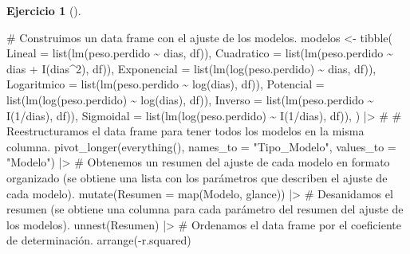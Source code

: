 \documentclass[
  spanish,
  a4paper,
]{scrreport}
\newenvironment{Shaded}{\begin{snugshade}}{\end{snugshade}}
\newcommand{\AttributeTok}[1]{\textcolor[rgb]{0.40,0.45,0.13}{#1}}
\newcommand{\CommentTok}[1]{\textcolor[rgb]{0.37,0.37,0.37}{#1}}
\newcommand{\DecValTok}[1]{\textcolor[rgb]{0.68,0.00,0.00}{#1}}
\newcommand{\FunctionTok}[1]{\textcolor[rgb]{0.28,0.35,0.67}{#1}}
\newcommand{\NormalTok}[1]{\textcolor[rgb]{0.00,0.23,0.31}{#1}}
\newcommand{\OtherTok}[1]{\textcolor[rgb]{0.00,0.23,0.31}{#1}}
\newcommand{\SpecialCharTok}[1]{\textcolor[rgb]{0.37,0.37,0.37}{#1}}
\newcommand{\StringTok}[1]{\textcolor[rgb]{0.13,0.47,0.30}{#1}}
\theoremstyle{definition}
\newtheorem{exercise}{Ejercicio}[chapter]
\theoremstyle{remark}
\begin{document}
\begin{exercise}[]
\begin{enumerate}
\begin{tcolorbox}
\begin{Shaded}
\begin{Highlighting}[]
\CommentTok{\# Construimos un data frame con el ajuste de los modelos.}
\NormalTok{modelos }\OtherTok{\textless{}{-}} \FunctionTok{tibble}\NormalTok{(}
        \AttributeTok{Lineal =} \FunctionTok{list}\NormalTok{(}\FunctionTok{lm}\NormalTok{(peso.perdido }\SpecialCharTok{\textasciitilde{}}\NormalTok{ dias, df)),}
        \AttributeTok{Cuadratico =} \FunctionTok{list}\NormalTok{(}\FunctionTok{lm}\NormalTok{(peso.perdido }\SpecialCharTok{\textasciitilde{}}\NormalTok{ dias }\SpecialCharTok{+} \FunctionTok{I}\NormalTok{(dias}\SpecialCharTok{\^{}}\DecValTok{2}\NormalTok{), df)),}
        \AttributeTok{Exponencial =} \FunctionTok{list}\NormalTok{(}\FunctionTok{lm}\NormalTok{(}\FunctionTok{log}\NormalTok{(peso.perdido) }\SpecialCharTok{\textasciitilde{}}\NormalTok{ dias, df)),}
        \AttributeTok{Logaritmico =} \FunctionTok{list}\NormalTok{(}\FunctionTok{lm}\NormalTok{(peso.perdido }\SpecialCharTok{\textasciitilde{}} \FunctionTok{log}\NormalTok{(dias), df)),}
        \AttributeTok{Potencial =} \FunctionTok{list}\NormalTok{(}\FunctionTok{lm}\NormalTok{(}\FunctionTok{log}\NormalTok{(peso.perdido) }\SpecialCharTok{\textasciitilde{}} \FunctionTok{log}\NormalTok{(dias), df)),}
        \AttributeTok{Inverso =} \FunctionTok{list}\NormalTok{(}\FunctionTok{lm}\NormalTok{(peso.perdido }\SpecialCharTok{\textasciitilde{}} \FunctionTok{I}\NormalTok{(}\DecValTok{1}\SpecialCharTok{/}\NormalTok{dias), df)),}
        \AttributeTok{Sigmoidal =} \FunctionTok{list}\NormalTok{(}\FunctionTok{lm}\NormalTok{(}\FunctionTok{log}\NormalTok{(peso.perdido) }\SpecialCharTok{\textasciitilde{}} \FunctionTok{I}\NormalTok{(}\DecValTok{1}\SpecialCharTok{/}\NormalTok{dias), df)),}
\NormalTok{    )  }\SpecialCharTok{|\textgreater{}} 
    \CommentTok{\# }
    \CommentTok{\# Reestructuramos el data frame para tener todos los modelos en la misma columna.}
    \FunctionTok{pivot\_longer}\NormalTok{(}\FunctionTok{everything}\NormalTok{(), }\AttributeTok{names\_to =} \StringTok{"Tipo\_Modelo"}\NormalTok{, }\AttributeTok{values\_to =} \StringTok{"Modelo"}\NormalTok{)  }\SpecialCharTok{|\textgreater{}} 
    \CommentTok{\# Obtenemos un resumen del ajuste de cada modelo en formato organizado (se obtiene una lista con los parámetros que describen el ajuste de cada modelo).}
    \FunctionTok{mutate}\NormalTok{(}\AttributeTok{Resumen =} \FunctionTok{map}\NormalTok{(Modelo, glance)) }\SpecialCharTok{|\textgreater{}} 
    \CommentTok{\# Desanidamos el resumen (se obtiene una columna para cada parámetro del resumen del ajuste de los modelos).}
    \FunctionTok{unnest}\NormalTok{(Resumen)  }\SpecialCharTok{|\textgreater{}} 
    \CommentTok{\# Ordenamos el data frame por el coeficiente de determinación.}
    \FunctionTok{arrange}\NormalTok{(}\SpecialCharTok{{-}}\NormalTok{r.squared)}


\end{Highlighting}
\end{Shaded}
\end{tcolorbox}
\end{enumerate}
\end{exercise}
\end{document}
